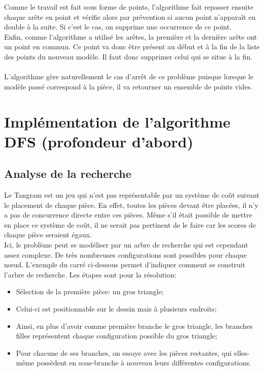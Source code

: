 \documentclass[a4paper, 11pt]{report}
\begin{document}
		
		Comme le travail est fait sous forme de points, l'algorithme fait repasser ensuite chaque arête en point et vérifie alors par prévention si aucun point n'apparaît en double à la suite. Si c'est le cas, on supprime une occurrence de ce point. \\
		Enfin, comme l'algorithme a utilisé les arêtes, la première et la dernière arête ont un point en commun. Ce point va donc être présent au début et à la fin de la liste des points du nouveau modèle. Il faut donc supprimer celui qui se situe à la fin.\\ \ \\
		
		L'algorithme gère naturellement le cas d'arrêt de ce problème puisque lorsque le modèle passé correspond à la pièce, il va retourner un ensemble de points vides.
		
		\section{Implémentation de l'algorithme DFS (profondeur d'abord)}
		
 			\subsection{Analyse de la recherche}

		Le Tangram est un jeu qui n'est pas représentable par un système de coût suivant le placement de chaque pièce. En effet, toutes les pièces devant être placées, il n'y a pas de concurrence directe entre ces pièces. Même s'il était possible de mettre en place ce système de coût, il ne serait pas pertinent de le
faire car les scores de chaque pièce seraient égaux.\\
		Ici, le problème peut se modéliser par un arbre de recherche qui est cependant assez complexe. De très nombreuses configurations sont possibles pour chaque nœud. L'exemple du carré ci-dessous permet d'indiquer comment se construit l'arbre de recherche. Les étapes sont pour la résolution:
		\begin{itemize}
			\item Sélection de la première pièce: un gros triangle;
			\item Celui-ci est positionnable sur le dessin mais à plusieurs endroits;
			\item Ainsi, en plus d'avoir comme première branche le gros triangle, les branches filles représentent chaque configuration possible du gros triangle;
			\item Pour chacune de ses branches, on essaye avec les pièces restantes, qui elles-même possèdent en sous-branche à nouveau leurs différentes configurations.\\
		\end{itemize}
		
\end{document}

